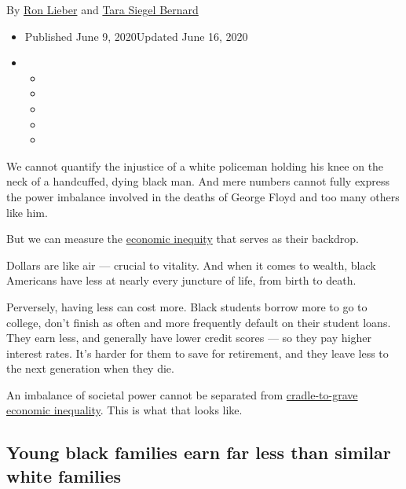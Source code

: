 By \href{https://www.nytimes3xbfgragh.onion/by/ron-lieber}{Ron Lieber}
and
\href{https://www.nytimes3xbfgragh.onion/by/tara-siegel-bernard}{Tara
Siegel Bernard}

\begin{itemize}
\item
  Published June 9, 2020Updated June 16, 2020
\item
  \begin{itemize}
  \item
  \item
  \item
  \item
  \item
  \end{itemize}
\end{itemize}

We cannot quantify the injustice of a white policeman holding his knee
on the neck of a handcuffed, dying black man. And mere numbers cannot
fully express the power imbalance involved in the deaths of George Floyd
and too many others like him.

But we can measure the
\href{https://www.nytimes3xbfgragh.onion/interactive/2020/06/11/multimedia/coronavirus-new-york-inequality.html}{economic
inequity} that serves as their backdrop.

Dollars are like air --- crucial to vitality. And when it comes to
wealth, black Americans have less at nearly every juncture of life, from
birth to death.

Perversely, having less can cost more. Black students borrow more to go
to college, don't finish as often and more frequently default on their
student loans. They earn less, and generally have lower credit scores
--- so they pay higher interest rates. It's harder for them to save for
retirement, and they leave less to the next generation when they die.

An imbalance of societal power cannot be separated from
\href{https://www.nytimes3xbfgragh.onion/interactive/2018/03/19/upshot/race-class-white-and-black-men.html}{cradle-to-grave
economic inequality}. This is what that looks like.

\hypertarget{young-black-families-earn-far-less-than-similar-white-families}{%
\subsection{Young black families earn far less than similar white
families}\label{young-black-families-earn-far-less-than-similar-white-families}}

